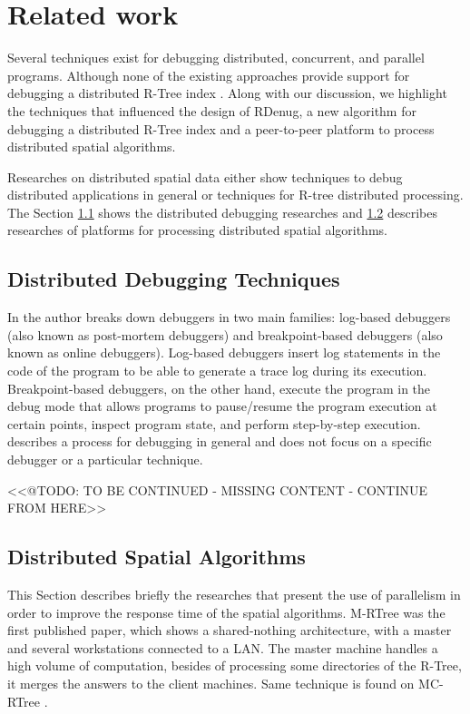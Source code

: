 \section{Related work}
\label{sec:related}

Several techniques exist for debugging distributed, concurrent, and parallel programs. Although none of the existing approaches provide support for debugging a distributed R-Tree index \cite{manolopoulos2003rth,jacox2007spatial}. Along with our discussion, we highlight the techniques that influenced the design of RDenug, a new algorithm for debugging a distributed R-Tree index and a peer-to-peer platform to process distributed spatial algorithms.

Researches on distributed spatial data either show techniques to debug distributed applications in general or techniques for R-tree distributed processing. The Section \ref{dist_debug} shows the distributed debugging researches and \ref{spatialdist} describes researches of platforms for processing distributed spatial algorithms.
	
\subsection{Distributed Debugging Techniques}
\label{dist_debug}

In \cite{remeD2011} the author breaks down debuggers in two main families: log-based debuggers (also known as post-mortem debuggers) and breakpoint-based debuggers (also known as online debuggers). Log-based debuggers insert log statements in the code of the program to be able to generate a trace log during its execution. Breakpoint-based debuggers, on the other hand, execute the program in the debug mode that allows programs to pause/resume the program execution at certain points, inspect program state, and perform step-by-step execution.
\cite{cheung1990Framework} describes a process for debugging in general and does not focus on a specific debugger or a particular technique.

<<@TODO: TO BE CONTINUED - MISSING CONTENT - CONTINUE FROM HERE>>

	
\subsection{Distributed Spatial Algorithms}
\label{spatialdist}

This Section describes briefly the researches that present the use of parallelism in order to improve the response time of the spatial algorithms. M-RTree \cite{koudas1996declustering} was the first published paper, which shows a shared-nothing architecture, with a master and several workstations connected to a LAN. The master machine handles a high volume of computation, besides of processing some directories of the R-Tree, it merges the answers to the client machines. Same technique is found on MC-RTree \cite{schnitzer1999master}.

